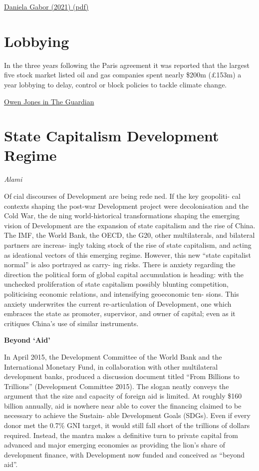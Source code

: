 \documentclass[
]{book}
\begin{document}
\href{pdf/Gabor_2021_Revolution.pdf}{Daniela Gabor (2021) (pdf)}

\hypertarget{lobbying}{%
\section{Lobbying}\label{lobbying}}

In the three years following the Paris agreement it was reported that the largest five stock market listed oil and gas companies spent nearly \$200m (£153m) a year lobbying to delay, control or block policies to tackle climate change.

\href{https://www.theguardian.com/commentisfree/2021/mar/19/planet-pursuit-profit-oil-companies-damage}{Owen Jones in The Guardian}

\hypertarget{state-capitalism-development-regime}{%
\section{State Capitalism Development Regime}\label{state-capitalism-development-regime}}

\emph{Alami}

Ofcial discourses of Development are being redened. If the key geopoliti-
cal contexts shaping the post-war Development project were decolonisation and the
Cold War, the dening world-historical transformations shaping the emerging vision of
Development are the expansion of state capitalism and the rise of China. The IMF, the
World Bank, the OECD, the G20, other multilaterals, and bilateral partners are increas-
ingly taking stock of the rise of state capitalism, and acting as ideational vectors of this
emerging regime. However, this new ``state capitalist normal'' is also portrayed as carry-
ing risks. There is anxiety regarding the direction the political form of global capital
accumulation is heading: with the unchecked proliferation of state capitalism possibly
blunting competition, politicising economic relations, and intensifying geoeconomic ten-
sions. This anxiety underwrites the current re-articulation of Development, one which
embraces the state as promoter, supervisor, and owner of capital; even as it critiques
China's use of similar instruments.

\textbf{Beyond `Aid'}

In April 2015, the Development Committee of the World Bank and
the International Monetary Fund, in collaboration with other
multilateral development banks,
produced a discussion document titled ``From Billions to Trillions'' (Development
Committee 2015). The slogan neatly conveys the argument that the size and
capacity of foreign aid is limited. At roughly \$160 billion annually, aid is nowhere
near able to cover the financing claimed to be necessary to achieve the Sustain-
able Development Goals (SDGs). Even if every donor met the 0.7\% GNI target, it
would still fall short of the trillions of dollars required. Instead, the mantra makes
a definitive turn to private capital from advanced and major emerging economies
as providing the lion's share of development finance, with Development now
funded and conceived as ``beyond aid''.
\end{document}
